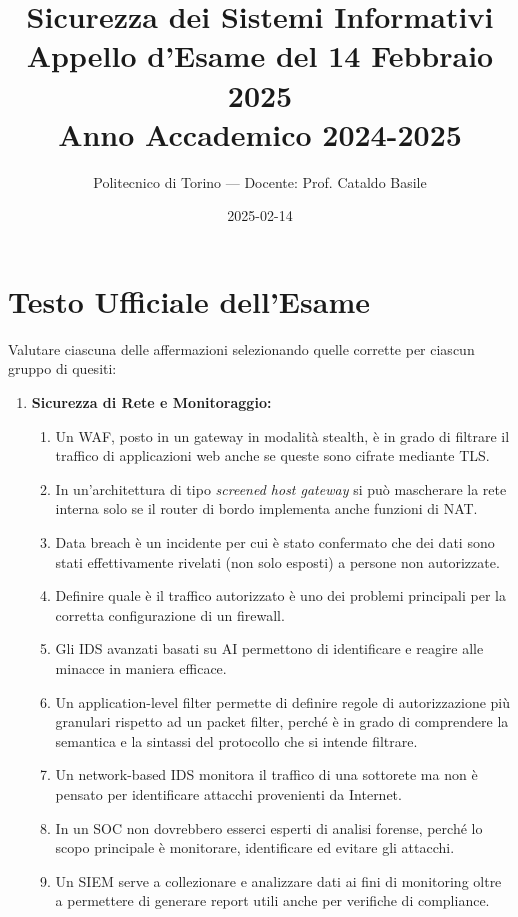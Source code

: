 \documentclass[11pt,a4paper]{article}
\begin{document}
\title{\textbf{Sicurezza dei Sistemi Informativi} \\ \large Appello d'Esame del 14 Febbraio 2025 \\ \small Anno Accademico 2024-2025}
\author{Politecnico di Torino --- Docente: Prof. Cataldo Basile}
\date{2025-02-14}
\maketitle


\section{Testo Ufficiale dell'Esame}

\begin{questionbox}
Valutare ciascuna delle affermazioni selezionando quelle corrette per ciascun gruppo di quesiti:
\begin{enumerate}[label=\textbf{1.\arabic*}]
    \item \textbf{Sicurezza di Rete e Monitoraggio:}
    \begin{enumerate}[label=\alph*.]
        \item Un WAF, posto in un gateway in modalit\`a stealth, \`e in grado di filtrare il traffico di applicazioni web anche se queste sono cifrate mediante TLS.
        \item In un'architettura di tipo \textit{screened host gateway} si pu\`o mascherare la rete interna solo se il router di bordo implementa anche funzioni di NAT.
        \item Data breach \`e un incidente per cui \`e stato confermato che dei dati sono stati effettivamente rivelati (non solo esposti) a persone non autorizzate.
        \item Definire quale \`e il traffico autorizzato \`e uno dei problemi principali per la corretta configurazione di un firewall.
        \item Gli IDS avanzati basati su AI permettono di identificare e reagire alle minacce in maniera efficace.
        \item Un application-level filter permette di definire regole di autorizzazione pi\`u granulari rispetto ad un packet filter, perch\'e \`e in grado di comprendere la semantica e la sintassi del protocollo che si intende filtrare.
        \item Un network-based IDS monitora il traffico di una sottorete ma non \`e pensato per identificare attacchi provenienti da Internet.
        \item In un SOC non dovrebbero esserci esperti di analisi forense, perch\'e lo scopo principale \`e monitorare, identificare ed evitare gli attacchi.
        \item Un SIEM serve a collezionare e analizzare dati ai fini di monitoring oltre a permettere di generare report utili anche per verifiche di compliance.
    \end{enumerate}


\end{enumerate}
\end{questionbox}
\end{document}
